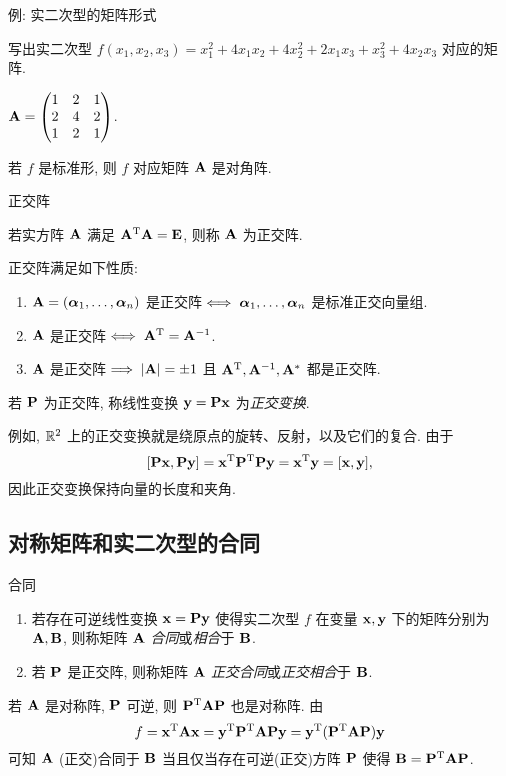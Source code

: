 \begin{frame}{例: 实二次型的矩阵形式}
	\onslide<+->
	\begin{example}
		写出实二次型 $f(x_1,x_2,x_3)=x_1^2+4x_1x_2+4x_2^2+2x_1x_3+x_3^2+4x_2x_3$ 对应的矩阵.
	\end{example}
	\onslide<+->
	\begin{solution}
		${\mathbf{A}}=\begin{pmatrix}
			1&2&1\\
			2&4&2\\
			1&2&1
		\end{pmatrix}$.
	\end{solution}
	\onslide<+->
	若 $f$ 是标准形, 则 $f$ 对应矩阵 ${\mathbf{A}}$ 是对角阵.
\end{frame}


\begin{frame}{正交阵}
	\onslide<+->
	\begin{definition}
		若实方阵 ${\mathbf{A}}$ 满足 ${\mathbf{A}}^{\mathrm{T}}{\mathbf{A}}={\mathbf{E}}$, 则称 ${\mathbf{A}}$ 为正交阵.
	\end{definition}
	\onslide<+->
	正交阵满足如下性质:
	\onslide<+->
	\begin{enumerate}
		\item ${\mathbf{A}}=({\boldsymbol{\alpha}}_1,\dots,{\boldsymbol{\alpha}}_n)$ 是正交阵$\iff {\boldsymbol{\alpha}}_1,\dots,{\boldsymbol{\alpha}}_n$ 是标准正交向量组.
		\item ${\mathbf{A}}$ 是正交阵$\iff{\mathbf{A}}^{\mathrm{T}}={\mathbf{A}}^{-1}$.
		\item ${\mathbf{A}}$ 是正交阵$\implies|{\mathbf{A}}|=\pm1$ 且 ${\mathbf{A}}^{\mathrm{T}},{\mathbf{A}}^{-1},{\mathbf{A}}^*$ 都是正交阵.
	\end{enumerate}
	\onslide<+->
	\begin{definition}
		若 ${\mathbf{P}}$ 为正交阵, 称线性变换 ${\mathbf{y}}={\mathbf{P}}{\mathbf{x}}$ 为\emph{正交变换}.
	\end{definition}
	\onslide<+->
	例如, ${\mathbb{R}}^2$ 上的正交变换就是绕原点的旋转、反射，以及它们的复合.
	\onslide<+->
	由于
	\[[{\mathbf{P}}{\mathbf{x}},{\mathbf{P}}{\mathbf{y}}]={\mathbf{x}}^{\mathrm{T}}{\mathbf{P}}^{\mathrm{T}}{\mathbf{P}}{\mathbf{y}}={\mathbf{x}}^{\mathrm{T}}{\mathbf{y}}=[{\mathbf{x}},{\mathbf{y}}],\]
	因此\alert{正交变换保持向量的长度和夹角}.
\end{frame}


\subsection{对称矩阵和实二次型的合同}
\begin{frame}{合同}
	\onslide<+->
	\begin{definition}
		\begin{enumerate}
			\item 若存在可逆线性变换 ${\mathbf{x}}={\mathbf{P}}{\mathbf{y}}$ 使得实二次型 $f$ 在变量 ${\mathbf{x}},{\mathbf{y}}$ 下的矩阵分别为 ${\mathbf{A}},{\mathbf{B}}$, 则称矩阵 ${\mathbf{A}}$ \emph{合同}或\emph{相合}于 ${\mathbf{B}}$.
			\item 若 ${\mathbf{P}}$ 是正交阵, 则称矩阵 ${\mathbf{A}}$ \emph{正交合同}或\emph{正交相合}于 ${\mathbf{B}}$.
		\end{enumerate}
	\end{definition}
	\onslide<+->
	若 ${\mathbf{A}}$ 是对称阵, ${\mathbf{P}}$ 可逆, 则 ${\mathbf{P}}^{\mathrm{T}}{\mathbf{A}}{\mathbf{P}}$ 也是对称阵.
	\onslide<+->
	由
	\[f={\mathbf{x}}^{\mathrm{T}}{\mathbf{A}}{\mathbf{x}}={\mathbf{y}}^{\mathrm{T}}{\mathbf{P}}^{\mathrm{T}}{\mathbf{A}}{\mathbf{P}}{\mathbf{y}}
	={\mathbf{y}}^{\mathrm{T}}({\mathbf{P}}^{\mathrm{T}}{\mathbf{A}}{\mathbf{P}}){\mathbf{y}}\]
	可知 ${\mathbf{A}}$ (正交)合同于 ${\mathbf{B}}$ 当且仅当存在可逆(正交)方阵 ${\mathbf{P}}$ 使得 ${\mathbf{B}}={\mathbf{P}}^{\mathrm{T}}{\mathbf{A}}{\mathbf{P}}$.
\end{frame}


